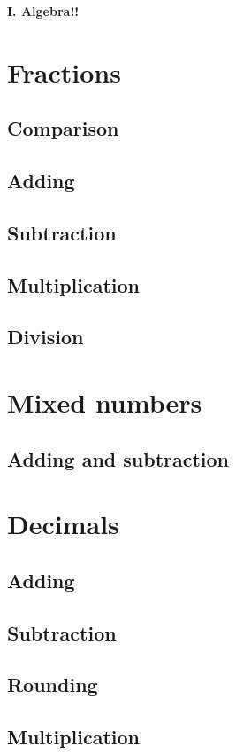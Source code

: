 \documentclass[a4paper, 12pt]{article}
\begin{document}
	
	{\huge \textbf{I. Algebra!!}}

	{\Large \section {Fractions}}

	\subsection{Comparison}
	\subsection{Adding}
	\subsection{Subtraction}
	\subsection{Multiplication}
	\subsection{Division}

	{\Large \section {Mixed numbers}}

	\subsection{Adding and subtraction}

	{\Large \section {Decimals}}
	
	\subsection{Adding}
	\subsection{Subtraction}
	\subsection{Rounding}
	\subsection{Multiplication}
\end{document}
